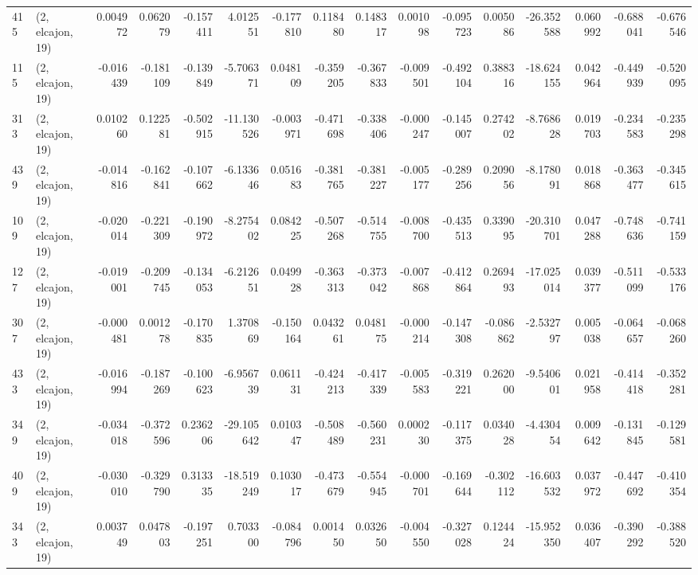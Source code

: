 \begin{tabular}{llrrrrrrrrrrrrrr}
415 &  (2, elcajon, 19) &   0.004972 &  0.062079 & -0.157411 &    4.012551 & -0.177810 &   0.118480 &  0.148317 &  0.001098 & -0.095723 &  0.005086 &  -26.352588 &  0.060992 & -0.688041 & -0.676546 \\
115 &  (2, elcajon, 19) &  -0.016439 & -0.181109 & -0.139849 &   -5.706371 &  0.048109 &  -0.359205 & -0.367833 & -0.009501 & -0.492104 &  0.388316 &  -18.624155 &  0.042964 & -0.449939 & -0.520095 \\
313 &  (2, elcajon, 19) &   0.010260 &  0.122581 & -0.502915 &  -11.130526 & -0.003971 &  -0.471698 & -0.338406 & -0.000247 & -0.145007 &  0.274202 &   -8.768628 &  0.019703 & -0.234583 & -0.235298 \\
439 &  (2, elcajon, 19) &  -0.014816 & -0.162841 & -0.107662 &   -6.133646 &  0.051683 &  -0.381765 & -0.381227 & -0.005177 & -0.289256 &  0.209056 &   -8.178091 &  0.018868 & -0.363477 & -0.345615 \\
109 &  (2, elcajon, 19) &  -0.020014 & -0.221309 & -0.190972 &   -8.275402 &  0.084225 &  -0.507268 & -0.514755 & -0.008700 & -0.435513 &  0.339095 &  -20.310701 &  0.047288 & -0.748636 & -0.741159 \\
127 &  (2, elcajon, 19) &  -0.019001 & -0.209745 & -0.134053 &   -6.212651 &  0.049928 &  -0.363313 & -0.373042 & -0.007868 & -0.412864 &  0.269493 &  -17.025014 &  0.039377 & -0.511099 & -0.533176 \\
307 &  (2, elcajon, 19) &  -0.000481 &  0.001278 & -0.170835 &    1.370869 & -0.150164 &   0.043261 &  0.048175 & -0.000214 & -0.147308 & -0.086862 &   -2.532797 &  0.005038 & -0.064657 & -0.068260 \\
433 &  (2, elcajon, 19) &  -0.016994 & -0.187269 & -0.100623 &   -6.956739 &  0.061131 &  -0.424213 & -0.417339 & -0.005583 & -0.319221 &  0.262000 &   -9.540601 &  0.021958 & -0.414418 & -0.352281 \\
349 &  (2, elcajon, 19) &  -0.034018 & -0.372596 &  0.236206 &  -29.105642 &  0.010347 &  -0.508489 & -0.560231 &  0.000230 & -0.117375 &  0.034028 &   -4.430454 &  0.009642 & -0.131845 & -0.129581 \\
409 &  (2, elcajon, 19) &  -0.030010 & -0.329790 &  0.313335 &  -18.519249 &  0.103017 &  -0.473679 & -0.554945 & -0.000701 & -0.169644 & -0.302112 &  -16.603532 &  0.037972 & -0.447692 & -0.410354 \\
343 &  (2, elcajon, 19) &   0.003749 &  0.047803 & -0.197251 &    0.703300 & -0.084796 &   0.001450 &  0.032650 & -0.004550 & -0.327028 &  0.124424 &  -15.952350 &  0.036407 & -0.390292 & -0.388520 \\

\end{tabular}

